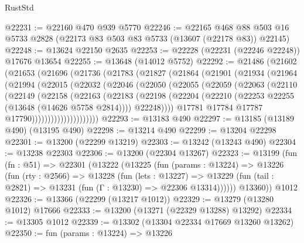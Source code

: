 \begin{lexlean}{RustStd}
\begin{coremodule}
@22231 := @22160 @470 @939 @5770
@22246 := @22165
    @468
    @88
    @503
    @16
    @5733
    @2828
    (@22173 @83 @503 @83 @5733 (@13607 (@22178 @83)) @22145)
@22248 := @13624 @22150 @2635
@22253 := @22228 (@22231 (@22246 @22248)) @17676 @13654
@22255 := @13648 (@14012 @5752)
@22292 := @21486
    (@21602
      (@21653
        (@21696
          (@21736
            (@21783
              (@21827
                (@21864
                  (@21901
                    (@21934
                      (@21964
                        (@21994
                          (@22015
                            (@22032
                              (@22046
                                (@22050
                                  (@22055
                                    (@22059
                                      (@22063
                                        (@22110
                                          (@22149
                                            (@22158
                                              (@22163
                                                (@22183
                                                  (@22198
                                                    (@22204
                                                      (@22210
                                                        (@22253
                                                          @22255
                                                          (@13648 (@14626 @5758 @2814))))
                                                      @22248))))
                                              @17781
                                              @17784
                                              @17787
                                              @17790)))))))))))))))))))))
@22293 := @13183 @490
@22297 := @13185 (@13189 @490) (@13195 @490)
@22298 := @13214 @490
@22299 := @13204 @22298
@22301 := @13200 (@22299 @13219)
@22303 := @13242 (@13243 @490)
@22304 := @13238 @22303
@22306 := @13200 (@22304 @13267)
@22323 := @13199
    (fun (fn : @51) =>
    @22301
      (@13222
        (@13225
          (fun (params : @13224) =>
          @13226
            (fun (rty : @2566) =>
            @13228
              (fun (lets : @13227) =>
              @13229 (fun (tail : @2821) => @13231 (fun (Γ : @13230) => @22306 @13314))))))
        @13360))
    @1012
@22326 := @13366 (@22299 (@13217 @1012))
@22329 := @13279 (@13280 @1012) @17666
@22333 := @13200 (@13271 (@22329 @13288) @13292)
@22334 := @13305 @1012
@22339 := @13302 (@13304 @22334 @17669 @13260 @13262)
@22350 := fun (params : @13224) =>
  @13226

\end{coremodule}
\end{lexlean}
